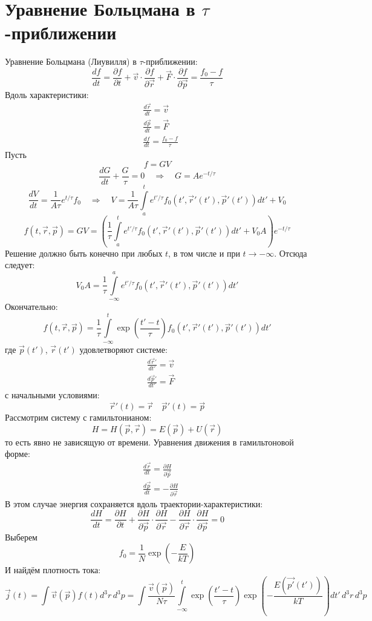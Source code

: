 \section{Уравнение Больцмана в $\tau$-приближении}

Уравнение Больцмана (Лиувилля) в $\tau$-приближении:
\[
	\frac{d f}{d t} = \frac{\partial f}{\partial t} + \vec{v} \cdot \frac{\partial f}{\partial \vec{r}} + \vec{F} \cdot \frac{\partial f}{\partial \vec{p}} = \frac{f_0 - f}{\tau}
\]
Вдоль характеристики:
\[
	\begin{aligned}
	& \frac{d \vec{r}}{d t} = \vec{v} \\
	& \frac{d \vec{p}}{d t} = \vec{F} \\
	& \frac{d f}{d t} = \frac{f_0 - f}{\tau}
	\end{aligned}
\]
Пусть 
\[
	f = GV
\]
\[
	\frac{d G}{d t} + \frac{G}{\tau} = 0 \quad \Rightarrow \quad G = A e^{-t/\tau}
\]
\[
	\frac{d V}{d t} = \frac{1}{A \tau} e^{t/\tau} f_0 \quad \Rightarrow \quad V = \frac{1}{A \tau} \int\limits_{a}^t e^{t'/\tau}f_0(t', \vec{r}'(t'), \vec{p}'(t')) dt'  + V_0 
\]
\[
	f(t, \vec{r}, \vec{p})  = GV = \left(\frac{1}{\tau} \int\limits_{a}^t e^{t'/\tau}f_0(t', \vec{r}'(t'), \vec{p}'(t')) dt'  + V_0 A \right) e^{-t/\tau}
\]
Решение должно быть конечно при любых $t$, в том числе и при $t \to -\infty$. Отсюда следует:
\[
	V_0 A = \frac{1}{\tau} \int\limits_{-\infty}^{a} e^{t'/\tau}f_0(t', \vec{r}'(t'), \vec{p}'(t')) dt'
\]
Окончательно:
\[
	f(t, \vec{r}, \vec{p}) = \frac{1}{\tau} \int\limits_{-\infty}^t \exp \left(\frac{t' - t}{\tau}\right) f_0(t', \vec{r}'(t'), \vec{p}'(t')) dt'
\]
где $\vec{p}(t')$, $\vec{r}(t')$ удовлетворяют системе:
\[
	\begin{aligned}
	& \frac{d \vec{r}'}{d t'} = \vec{v} \\
	& \frac{d \vec{p}'}{d t'} = \vec{F}
	\end{aligned} 
\]
с начальными условиями:
\[
	\vec{r}'(t) = \vec{r} \quad \vec{p}'(t) = \vec{p}
\]
Рассмотрим систему с гамильтонианом:
\[
	H = H(\vec{p}, \vec{r}) = E(\vec{p}) + U(\vec{r})
\]
то есть явно не зависящую от времени. Уравнения движения в гамильтоновой форме:
\[
	\begin{aligned}
	& \frac{d \vec{r}}{d t} = \frac{\partial H}{\partial \vec{p}} \\
	& \frac{d \vec{p}}{d t} = - \frac{\partial H}{\partial \vec{r}}
	\end{aligned}
\]
В этом случае энергия сохраняется вдоль траектории-характеристики:
\[
	\frac{d H}{d t} = 
	\frac{\partial H}{\partial t} + \frac{\partial H}{\partial \vec{p}} \cdot \frac{\partial H}{\partial \vec{r}} - \frac{\partial H}{\partial \vec{r}} \cdot \frac{\partial H}{\partial \vec{p}} = 0
\]
Выберем 
\[
	f_0 = \frac{1}{N} \exp \left(- \frac{E}{kT}\right)
\]
И найдём плотность тока:
\[
	\vec{j}(t) = \int \vec{v}(\vec{p}) f(t) d^3r\, d^3p = \int \frac{\vec{v}(\vec{p})}{N \tau} \int\limits_{-\infty}^t \exp \left(\frac{t' - t}{\tau}\right) \exp \left(- \frac{E(\vec{p'}(t'))}{kT}\right) dt'\, d^3r\, d^3p
\]